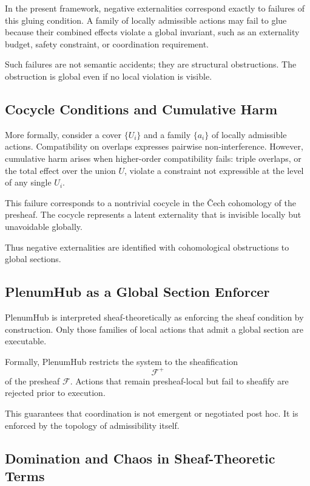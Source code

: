 \documentclass[11pt,oneside]{article}
\begin{document}
In the present framework, negative externalities correspond exactly to failures of this gluing condition. A family of locally admissible actions may fail to glue because their combined effects violate a global invariant, such as an externality budget, safety constraint, or coordination requirement.

Such failures are not semantic accidents; they are structural obstructions. The obstruction is global even if no local violation is visible.

\subsection{Cocycle Conditions and Cumulative Harm}

More formally, consider a cover \( \{U_i\} \) and a family \( \{a_i\} \) of locally admissible actions. Compatibility on overlaps expresses pairwise non-interference. However, cumulative harm arises when higher-order compatibility fails: triple overlaps, or the total effect over the union \( U \), violate a constraint not expressible at the level of any single \( U_i \).

This failure corresponds to a nontrivial cocycle in the Čech cohomology of the presheaf. The cocycle represents a latent externality that is invisible locally but unavoidable globally.

Thus negative externalities are identified with cohomological obstructions to global sections.

\subsection{PlenumHub as a Global Section Enforcer}

PlenumHub is interpreted sheaf-theoretically as enforcing the sheaf condition by construction. Only those families of local actions that admit a global section are executable.

Formally, PlenumHub restricts the system to the sheafification
\[
\mathcal{F}^{+}
\]
of the presheaf \( \mathcal{F} \). Actions that remain presheaf-local but fail to sheafify are rejected prior to execution.

This guarantees that coordination is not emergent or negotiated post hoc. It is enforced by the topology of admissibility itself.

\subsection{Domination and Chaos in Sheaf-Theoretic Terms}
\end{document}
